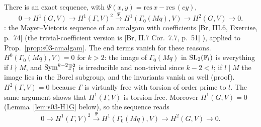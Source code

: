 \begin{proposition}\label{prop:s03-MV}
There is an exact sequence, with $\Psi(x,y)=\mathrm{res}\,x-\mathrm{res}\,(cy)$,
\[0\to H^1(G,V)\to H^1(\Gamma,V)^2\xrightarrow{\ \Psi\ }H^1(\Gamma_0(Mq),V)\to H^2(G,V)\to0.\]
\stpmc: the Mayer--Vietoris sequence of an amalgam with coefficients [Br, III.6, Exercise, p.~74]
 \stcited{} (the trivial-coefficient version is [Br, II.7 Cor.~7.7, p.~51]
), applied to Prop.~\ref{prop:s03-amalgam}. The end terms vanish for these reasons.
$H^0(\Gamma_0(Mq),V)=0$ for $k>2$: the image of $\Gamma_0(Mq)$ in $\mathrm{SL}_2(\mathbb{F}_l)$ is everything if $l\nmid M$, and $\mathrm{Sym}^{k-2}\mathbb{F}_l^2$ is irreducible and
non-trivial since $k-2<l$; if $l\mid M$ the image lies in the Borel subgroup, and the invariants vanish as well (proof). $H^2(\Gamma,V)=0$ because $\Gamma$ is virtually free with torsion of order prime to $l$. The same argument shows that $H^1(\Gamma,V)$ is torsion-free.
Moreover $H^1(G,V)=0$ (Lemma~\ref{lem:s03-H1G} below), so the sequence reads
\[0\to H^1(\Gamma,V)^2\xrightarrow{\ \Psi\ }H^1(\Gamma_0(Mq),V)\to H^2(G,V)\to0.\]
\end{proposition}
